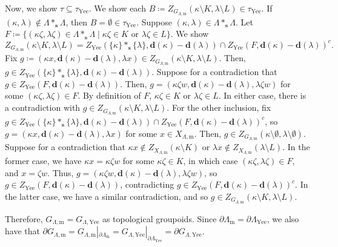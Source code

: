 \documentclass[11pt]{amsart}
\theoremstyle{definition}
\numberwithin{thm}{section}
\numberwithin{equation}{section}
\newcommand{\setof}[2]{\{ #1 \mid #2 \}}
\newcommand{\compl}[1]{#1^c}
\newcommand{\source}{\mathbf{s}}
\newcommand{\degree}{\mathbf{d}}
\newcommand{\ofYeend}{\mathrm{Yee}}
\newcommand{\M}{\mathrm{m}}
\newcommand{\PS}[2]{X_{#2, #1}}
\newcommand{\PG}[2]{{G_{#2, #1}}}
\newcommand{\BPS}[2]{\partial{#2}_{#1}}
\newcommand{\BPG}[2]{\partial\PG{#1}{#2}}
\newcommand{\reduction}[2]{#1|_{#2}}
\newcommand{\Fell}[3]{Z_{#1}\left(#2 \setminus #3\right)}
\newcommand{\Fellgpd}[5]{Z_{#1}\left(#2 \setminus #3, #4 \setminus #5\right)}
\begin{document}
Now, we show $\tau \subseteq \tau_\ofYeend$.
We show each $B \coloneqq \Fellgpd{\PG{\M}{\Lambda}}{\kappa}{K}{\lambda}{L} \in \tau_\ofYeend$.
If $(\kappa, \lambda) \notin \Lambda *_{\source} \Lambda$, then $B = \emptyset \in \tau_\ofYeend$.
Suppose $(\kappa, \lambda) \in \Lambda *_{\source} \Lambda$.
Let $F \coloneqq \setof{(\kappa\zeta, \lambda\zeta) \in \Lambda *_{\source} \Lambda}{\kappa\zeta \in K \text{ or } \lambda\zeta \in L}$.
We show 
\[
\Fellgpd{\PG{\M}{\Lambda}}{\kappa}{K}{\lambda}{L}
= Z_\ofYeend(\{\kappa\} *_{\source} \{\lambda\}, \degree(\kappa) - \degree(\lambda)) 
\cap \compl{Z_\ofYeend(F, \degree(\kappa) - \degree(\lambda))}.
\]
Fix $g \coloneqq (\kappa x, \degree(\kappa) - \degree(\lambda), \lambda x) \in \Fellgpd{\PG{\M}{\Lambda}}{\kappa}{K}{\lambda}{L}$.
Then, $g \in Z_\ofYeend(\{\kappa\} *_{\source} \{\lambda\}, \degree(\kappa) - \degree(\lambda))$.
Suppose for a contradiction that $g \in Z_\ofYeend(F, \degree(\kappa) - \degree(\lambda))$.
Then, $g = (\kappa\zeta w, \degree(\kappa) - \degree(\lambda), \lambda\zeta w)$ for some $(\kappa\zeta, \lambda\zeta) \in F$.
By definition of $F$, $\kappa\zeta \in K$ or $\lambda\zeta \in L$.
In either case, there is a contradiction with $g \in \Fellgpd{\PG{\M}{\Lambda}}{\kappa}{K}{\lambda}{L}$.
For the other inclusion, fix $g \in Z_\ofYeend(\{\kappa\} *_{\source} \{\lambda\}, \degree(\kappa) - \degree(\lambda)) \cap \compl{Z_\ofYeend(F, \degree(\kappa) - \degree(\lambda))}$, so $g = (\kappa x, \degree(\kappa) - \degree(\lambda), \lambda x)$ for some $x \in \PS{\M}{\Lambda}$.
Then, $g \in \Fellgpd{\PG{\M}{\Lambda}}{\kappa}{\emptyset}{\lambda}{\emptyset}$.
Suppose for a contradiction that $\kappa x \notin \Fell{\PS{\M}{\Lambda}}{\kappa}{K}$ or $\lambda x \notin \Fell{\PS{\M}{\Lambda}}{\lambda}{L}$.
In the former case, we have $\kappa x = \kappa\zeta w$ for some $\kappa\zeta \in K$, in which case $(\kappa\zeta, \lambda\zeta) \in F$, and $x = \zeta w$.
Thus, $g = (\kappa\zeta w, \degree(\kappa) - \degree(\lambda), \lambda\zeta w)$, so $g \in Z_\ofYeend(F, \degree(\kappa) - \degree(\lambda))$, contradicting $g \in \compl{Z_\ofYeend(F, \degree(\kappa) - \degree(\lambda))}$.
In the latter case, we have a similar contradiction, and so $g \in \Fellgpd{\PG{\M}{\Lambda}}{\kappa}{K}{\lambda}{L}$.

Therefore, $\PG{\M}{\Lambda} = \PG{\ofYeend}{\Lambda}$ as topological groupoids. 
Since $\BPS{\M}{\Lambda} = \BPS{\ofYeend}{\Lambda}$, we also have that
\(
\BPG{\M}{\Lambda}
= \reduction{\PG{\M}{\Lambda}}{\BPS{\M}{\Lambda}}
= \reduction{\PG{\ofYeend}{\Lambda}}{\BPS{\ofYeend}{\Lambda}}
= \BPG{\ofYeend}{\Lambda}.
\)
\end{document}
